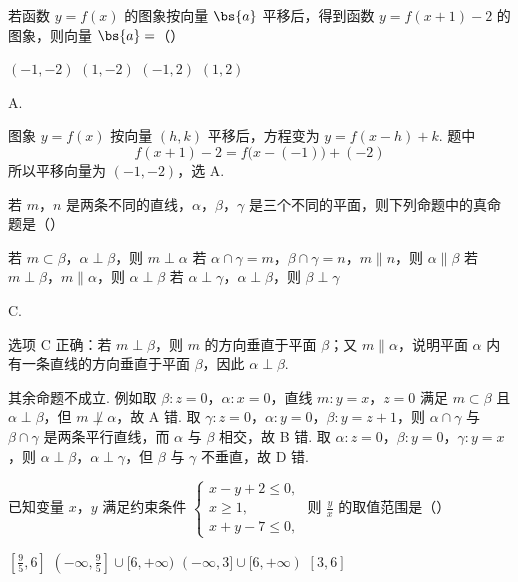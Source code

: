 \begin{problem}
若函数 \(y = f(x)\) 的图象按向量 \(\bs{a}\) 平移后，得到函数 \(y = f(x + 1) - 2\) 的图象，则向量 \(\bs{a} =\)（\quad）

\choices
    {\((-1, -2)\)}
    {\((1, -2)\)}
    {\((-1, 2)\)}
    {\((1, 2)\)}
\end{problem}

\begin{answer}
A.
\end{answer}

\begin{solution}
图象 \(y=f(x)\) 按向量 \((h,k)\) 平移后，方程变为 \(y=f(x-h)+k\). 题中
\[
f(x+1)-2=f\bigl(x-(-1)\bigr)+(-2)
\]
所以平移向量为 \((-1,-2)\)，选 A.
\end{solution}


\begin{problem}
若 \(m\)，\(n\) 是两条不同的直线，\(\alpha\)，\(\beta\)，\(\gamma\) 是三个不同的平面，则下列命题中的真命题是（\quad）

\choices
    {若 \(m \subset \beta\)，\(\alpha \perp \beta\)，则 \(m \perp \alpha\)}
    {若 \(\alpha \cap \gamma = m\)，\(\beta \cap \gamma = n\)，\(m \parallel n\)，则 \(\alpha \parallel \beta\)}
    {若 \(m \perp \beta\)，\(m \parallel \alpha\)，则 \(\alpha \perp \beta\)}
    {若 \(\alpha \perp \gamma\)，\(\alpha \perp \beta\)，则 \(\beta \perp \gamma\)}
\end{problem}

\begin{answer}
C.
\end{answer}

\begin{solution}
选项 C 正确：若 \(m\perp\beta\)，则 \(m\) 的方向垂直于平面 \(\beta\)；又 \(m\parallel\alpha\)，说明平面 \(\alpha\) 内有一条直线的方向垂直于平面 \(\beta\)，因此 \(\alpha\perp\beta\).

其余命题不成立. 例如取 \(\beta:z=0\)，\(\alpha:x=0\)，直线 \(m:y=x\)，\(z=0\) 满足 \(m\subset\beta\) 且 \(\alpha\perp\beta\)，但 \(m\not\perp\alpha\)，故 A 错. 取 \(\gamma:z=0\)，\(\alpha:y=0\)，\(\beta:y=z+1\)，则 \(\alpha\cap\gamma\) 与 \(\beta\cap\gamma\) 是两条平行直线，而 \(\alpha\) 与 \(\beta\) 相交，故 B 错. 取 \(\alpha:z=0\)，\(\beta:y=0\)，\(\gamma:y=x\)，则 \(\alpha\perp\beta\)，\(\alpha\perp\gamma\)，但 \(\beta\) 与 \(\gamma\) 不垂直，故 D 错.
\end{solution}


\begin{problem}
已知变量 \(x\)，\(y\) 满足约束条件 \(\begin{cases}
x - y + 2 \leqslant 0,\\
x \geqslant 1,\\
x + y - 7 \leqslant 0,
\end{cases}\) 则 \(\frac{y}{x}\) 的取值范围是（\quad）

\choices
    {\(\left[\frac{9}{5}, 6\right]\)}
    {\(\left(-\infty, \frac{9}{5}\right] \cup [6, +\infty)\)}
    {\((-\infty, 3] \cup [6, +\infty)\)}
    {\([3, 6]\)}
\end{problem}

